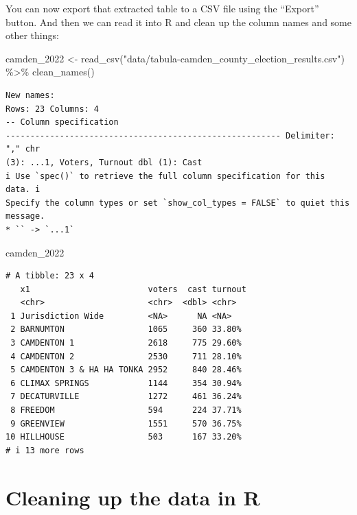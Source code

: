 \documentclass[
  letterpaper,
  DIV=11,
  numbers=noendperiod]{scrreprt}
\newenvironment{Shaded}{\begin{snugshade}}{\end{snugshade}}
\newcommand{\FunctionTok}[1]{\textcolor[rgb]{0.28,0.35,0.67}{#1}}
\newcommand{\NormalTok}[1]{\textcolor[rgb]{0.00,0.23,0.31}{#1}}
\newcommand{\OtherTok}[1]{\textcolor[rgb]{0.00,0.23,0.31}{#1}}
\newcommand{\SpecialCharTok}[1]{\textcolor[rgb]{0.37,0.37,0.37}{#1}}
\newcommand{\StringTok}[1]{\textcolor[rgb]{0.13,0.47,0.30}{#1}}
\begin{document}
You can now export that extracted table to a CSV file using the
``Export'' button. And then we can read it into R and clean up the
column names and some other things:

\begin{Shaded}
\begin{Highlighting}[]
\NormalTok{camden\_2022 }\OtherTok{\textless{}{-}} \FunctionTok{read\_csv}\NormalTok{(}\StringTok{"data/tabula{-}camden\_county\_election\_results.csv"}\NormalTok{) }\SpecialCharTok{\%\textgreater{}\%} \FunctionTok{clean\_names}\NormalTok{()}
\end{Highlighting}
\end{Shaded}

\begin{verbatim}
New names:
Rows: 23 Columns: 4
-- Column specification
-------------------------------------------------------- Delimiter: "," chr
(3): ...1, Voters, Turnout dbl (1): Cast
i Use `spec()` to retrieve the full column specification for this data. i
Specify the column types or set `show_col_types = FALSE` to quiet this message.
* `` -> `...1`
\end{verbatim}

\begin{Shaded}
\begin{Highlighting}[]
\NormalTok{camden\_2022}
\end{Highlighting}
\end{Shaded}

\begin{verbatim}
# A tibble: 23 x 4
   x1                        voters  cast turnout
   <chr>                     <chr>  <dbl> <chr>  
 1 Jurisdiction Wide         <NA>      NA <NA>   
 2 BARNUMTON                 1065     360 33.80% 
 3 CAMDENTON 1               2618     775 29.60% 
 4 CAMDENTON 2               2530     711 28.10% 
 5 CAMDENTON 3 & HA HA TONKA 2952     840 28.46% 
 6 CLIMAX SPRINGS            1144     354 30.94% 
 7 DECATURVILLE              1272     461 36.24% 
 8 FREEDOM                   594      224 37.71% 
 9 GREENVIEW                 1551     570 36.75% 
10 HILLHOUSE                 503      167 33.20% 
# i 13 more rows
\end{verbatim}

\hypertarget{cleaning-up-the-data-in-r}{%
\section{Cleaning up the data in R}\label{cleaning-up-the-data-in-r}}
\end{document}

